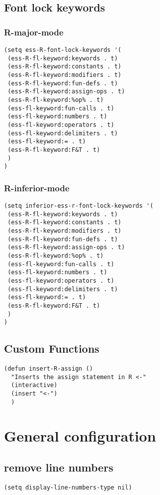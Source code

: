 \documentclass[11pt]{article}
\begin{document}
\subsection{Font lock keywords}
\label{sec:org2879436}
\subsubsection{R-major-mode}
\label{sec:orga90e0ff}
\begin{verbatim}
(setq ess-R-font-lock-keywords '(
 (ess-R-fl-keyword:keywords . t)
 (ess-R-fl-keyword:constants . t)
 (ess-R-fl-keyword:modifiers . t)
 (ess-R-fl-keyword:fun-defs . t)
 (ess-R-fl-keyword:assign-ops . t)
 (ess-R-fl-keyword:%op% . t)
 (ess-fl-keyword:fun-calls . t)
 (ess-fl-keyword:numbers . t)
 (ess-fl-keyword:operators . t)
 (ess-fl-keyword:delimiters . t)
 (ess-fl-keyword:= . t)
 (ess-R-fl-keyword:F&T . t)
 )
)
\end{verbatim}

\subsubsection{R-inferior-mode}
\label{sec:org83d3027}
\begin{verbatim}
(setq inferior-ess-r-font-lock-keywords '(
 (ess-R-fl-keyword:keywords . t)
 (ess-R-fl-keyword:constants . t)
 (ess-R-fl-keyword:modifiers . t)
 (ess-R-fl-keyword:fun-defs . t)
 (ess-R-fl-keyword:assign-ops . t)
 (ess-R-fl-keyword:%op% . t)
 (ess-fl-keyword:fun-calls . t)
 (ess-fl-keyword:numbers . t)
 (ess-fl-keyword:operators . t)
 (ess-fl-keyword:delimiters . t)
 (ess-fl-keyword:= . t)
 (ess-R-fl-keyword:F&T . t)
 )
)
\end{verbatim}
\subsection{Custom Functions}
\label{sec:org79072c8}
\begin{verbatim}
(defun insert-R-assign ()
  "Inserts the assign statement in R <-"
  (interactive)
  (insert "<-")
  )
\end{verbatim}

\section{General configuration}
\label{sec:orgabaeb3c}
\subsection{remove line numbers}
\label{sec:org9157342}
\begin{verbatim}
(setq display-line-numbers-type nil)
\end{verbatim}
\end{document}
